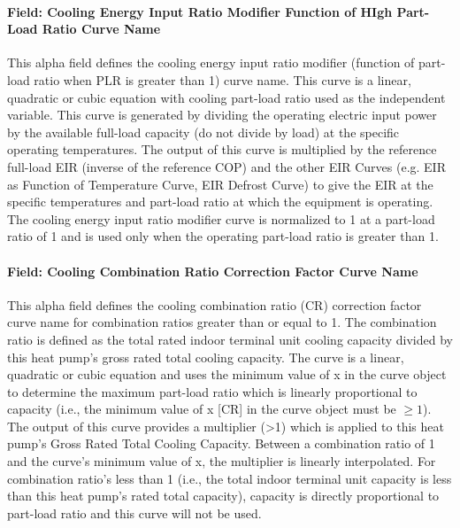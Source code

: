 \paragraph{Field: Cooling Energy Input Ratio Modifier Function of HIgh Part-Load Ratio Curve Name}\label{field-cooling-energy-input-ratio-modifier-function-of-high-part-load-ratio-curve-name}

This alpha field defines the cooling energy input ratio modifier (function of part-load ratio when PLR is greater than 1) curve name. This curve is a linear, quadratic or cubic equation with cooling part-load ratio used as the independent variable. This curve is generated by dividing the operating electric input power by the available full-load capacity (do not divide by load) at the specific operating temperatures. The output of this curve is multiplied by the reference full-load EIR (inverse of the reference COP) and the other EIR Curves (e.g. EIR as Function of Temperature Curve, EIR Defrost Curve) to give the EIR at the specific temperatures and part-load ratio at which the equipment is operating. The cooling energy input ratio modifier curve is normalized to 1 at a part-load ratio of 1 and is used only when the operating part-load ratio is greater than 1.

\paragraph{Field: Cooling Combination Ratio Correction Factor Curve Name}\label{field-cooling-combination-ratio-correction-factor-curve-name}

This alpha field defines the cooling combination ratio (CR) correction factor curve name for combination ratios greater than or equal to 1. The combination ratio is defined as the total rated indoor terminal unit cooling capacity divided by this heat pump's gross rated total cooling capacity. The curve is a linear, quadratic or cubic equation and uses the minimum value of x in the curve object to determine the maximum part-load ratio which is linearly proportional to capacity (i.e., the minimum value of x {[}CR{]} in the curve object must be \(\ge 1\)). The output of this curve provides a multiplier (\textgreater{}1) which is applied to this heat pump's Gross Rated Total Cooling Capacity. Between a combination ratio of 1 and the curve's minimum value of x, the multiplier is linearly interpolated. For combination ratio's less than 1 (i.e., the total indoor terminal unit capacity is less than this heat pump's rated total capacity), capacity is directly proportional to part-load ratio and this curve will not be used.


